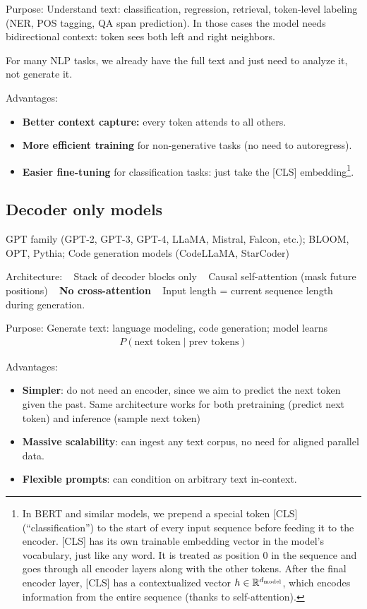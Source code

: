 \documentclass[11pt]{article}  %
\begin{document}
Purpose: Understand text: classification, regression, retrieval, token-level labeling (NER, POS tagging, QA span prediction). In those cases the model needs bidirectional context: token sees both left and right neighbors.

For many NLP tasks, we already have the full text and just need to analyze it, not generate it.

Advantages:
\begin{itemize}
  \item \textbf{Better context capture:} every token attends to all others.
  \item \textbf{More efficient training} for non-generative tasks (no need to autoregress).
  \item \textbf{Easier fine-tuning} for classification tasks: just take the [CLS] embedding\footnote{In BERT and similar models, we prepend a special token [CLS] (“classification”) to the start of every input sequence before feeding it to the encoder. [CLS] has its own trainable embedding vector in the model's vocabulary, just like any word. It is treated as position $0$ in the sequence and goes through all encoder layers along with the other tokens. After the final encoder layer, [CLS] has a contextualized vector $h \in \mathbb{R}^{d_{\text{model}}}$, which encodes information from the entire sequence (thanks to self-attention).}.
\end{itemize}

\subsection{Decoder only models}

GPT family (GPT-2, GPT-3, GPT-4, LLaMA, Mistral, Falcon, etc.); BLOOM, OPT, Pythia; Code generation models (CodeLLaMA, StarCoder)

Architecture: \textbullet~ Stack of decoder blocks only \textbullet~ Causal self-attention (mask future positions) \textbullet~ \textbf{No cross-attention} \textbullet~ Input length = current sequence length during generation.

Purpose: Generate text: language modeling, code generation; model learns 
\begin{align*}
  P(\text{next token} \mid \text{prev tokens})
\end{align*}

Advantages:
\begin{itemize}
  \item \textbf{Simpler}: do not need an encoder, since we aim to predict the next token given the past. Same architecture works for both pretraining (predict next token) and inference (sample next token)
  \item \textbf{Massive scalability}: can ingest any text corpus, no need for aligned parallel data.
  \item \textbf{Flexible prompts}: can condition on arbitrary text in-context.
\end{itemize}
\end{document}
